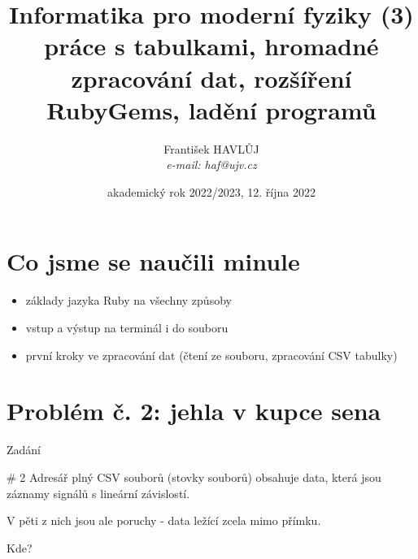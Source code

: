 \documentclass{beamer}
\title[IMF (3)]{Informatika pro moderní fyziky (3)\\práce s tabulkami, hromadné zpracování dat, rozšíření RubyGems, ladění programů}
\author[Franti\v{s}ek HAVL\r{U}J, ORF ÚJV Řež]{Franti\v{s}ek HAVL\r{U}J\\{\scriptsize \emph{e-mail: haf@ujv.cz}}}
\date{akademický rok 2022/2023, 12. října 2022}
\institute[ORF ÚJV Řež]
{ÚJV Řež\\oddělení Reaktorové fyziky a podpory palivového cyklu}
\begin{document}
\begin{frame}
  \titlepage
\end{frame}

\begin{frame}
  \tableofcontents
\end{frame}

\section{Co jsme se naučili minule}

\begin{frame}{}
  \begin{itemize}
    \item základy jazyka Ruby na všechny způsoby
    \item vstup a výstup na terminál i do souboru
    \item první kroky ve zpracování dat (čtení ze souboru, zpracování CSV tabulky)
  \end{itemize}
\end{frame}

\section{Problém č. 2: jehla v kupce sena}

\begin{frame}{Zadání}
  \begin{block}{\# 2}
    Adresář plný CSV souborů (stovky souborů) obsahuje data, která jsou záznamy signálů s lineární závislostí.

    V pěti z nich jsou ale poruchy - data ležící zcela mimo přímku.

    Kde?
  \end{block}
\end{frame}
\end{document}
